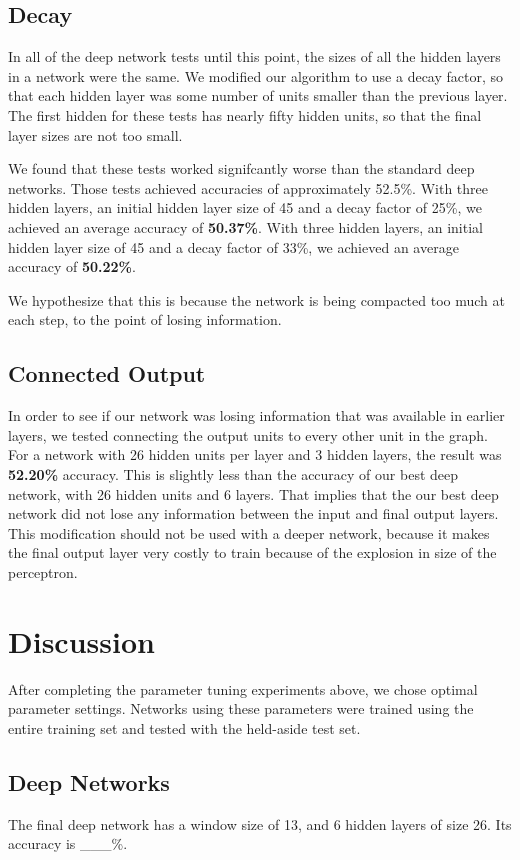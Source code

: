 \documentclass[letterpaper,twocolumn,12pt]{article}
\begin{document}
\subsection{Decay}
In all of the deep network tests until this point, the sizes of all the hidden layers in a network were the same.
We modified our algorithm to use a decay factor, so that each hidden layer was some number of units smaller than the previous layer.
The first hidden for these tests has nearly fifty hidden units, so that the final layer sizes are not too small.

We found that these tests worked signifcantly worse than the standard deep networks.
Those tests achieved accuracies of approximately 52.5\%.
With three hidden layers, an initial hidden layer size of 45 and a decay factor of 25\%, we achieved an average accuracy of \textbf{50.37\%}.
With three hidden layers, an initial hidden layer size of 45 and a decay factor of 33\%, we achieved an average accuracy of \textbf{50.22\%}.

We hypothesize that this is because the network is being compacted too much at each step, to the point of losing information.

\subsection{Connected Output}
In order to see if our network was losing information that was available in earlier layers, we tested connecting the output units to every other unit in the graph.
For a network with 26 hidden units per layer and 3 hidden layers, the result was \textbf{52.20\%} accuracy.
This is slightly less than the accuracy of our best deep network, with 26 hidden units and 6 layers.
That implies that the our best deep network did not lose any information between the input and final output layers.
This modification should not be used with a deeper network, because it makes the final output layer very costly to train because of the explosion in size of the perceptron.


\section{Discussion}
After completing the parameter tuning experiments above, we chose optimal parameter settings.
Networks using these parameters were trained using the entire training set and tested with the held-aside test set.

\subsection{Deep Networks}
The final deep network has a window size of 13, and 6 hidden layers of size 26.
Its accuracy is ___\%.
\end{document}

